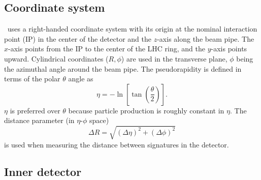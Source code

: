 \subsection{Coordinate system} 
\label{sec:coordinate_system}

\atlas\ uses a right-handed coordinate system with its origin at the nominal
interaction point (IP) in the center of the detector and the $z$-axis
along the beam pipe. The $x$-axis points from the IP to the center of the
LHC ring, and the $y$-axis points upward. Cylindrical coordinates
($R,\phi$) are used in the transverse plane, $\phi$ being the azimuthal
angle around the beam pipe. The pseudorapidity is defined in terms of the
polar $\theta$ angle as
\begin{equation}
  \eta = -\ln\left[\tan(\frac{\theta}{2})\right].
\end{equation}
$\eta$ is preferred over $\theta$ because particle production is roughly
constant in $\eta$.
The distance parameter (in $\eta$-$\phi$ space)
\begin{equation}
  \Delta R = \sqrt{(\Delta \eta)^2 + (\Delta \phi)^2}
\end{equation}
is used when measuring the distance between signatures in the detector.

\FloatBarrier
\subsection{Inner detector} 
\label{sec:id}

